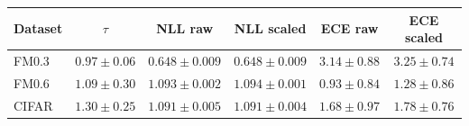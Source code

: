 \begin{tabular}{lccccc}
\toprule
Dataset & $\tau$ & NLL raw & NLL scaled & ECE raw & ECE scaled\\
\midrule
FM0.3 & $0.97\pm0.06$ & $0.648\pm0.009$ & $0.648\pm0.009$ & $3.14\pm0.88$ & $3.25\pm0.74$\\
FM0.6 & $1.09\pm0.30$ & $1.093\pm0.002$ & $1.094\pm0.001$ & $0.93\pm0.84$ & $1.28\pm0.86$\\
CIFAR & $1.30\pm0.25$ & $1.091\pm0.005$ & $1.091\pm0.004$ & $1.68\pm0.97$ & $1.78\pm0.76$\\
\bottomrule
\end{tabular}
